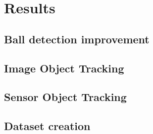 \chapter{Results}

\section{Ball detection improvement}
\section{Image Object Tracking}
\section{Sensor Object Tracking}
\section{Dataset creation}